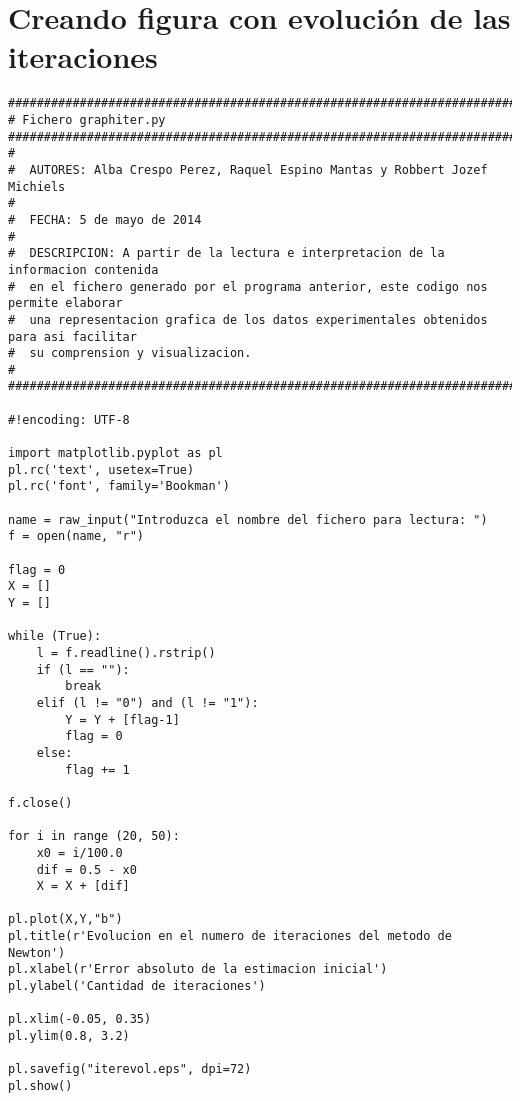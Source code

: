 \section{Creando figura con evoluci\'on de las iteraciones}
\label{Apendice2:label2}

\begin{center}
\begin{footnotesize}

\begin{verbatim}
#######################################################################################
# Fichero graphiter.py
#######################################################################################
#
#  AUTORES: Alba Crespo Perez, Raquel Espino Mantas y Robbert Jozef Michiels
#   
#  FECHA: 5 de mayo de 2014
#
#  DESCRIPCION: A partir de la lectura e interpretacion de la informacion contenida
#  en el fichero generado por el programa anterior, este codigo nos permite elaborar
#  una representacion grafica de los datos experimentales obtenidos para asi facilitar 
#  su comprension y visualizacion. 
#
#######################################################################################

#!encoding: UTF-8

import matplotlib.pyplot as pl
pl.rc('text', usetex=True)
pl.rc('font', family='Bookman')

name = raw_input("Introduzca el nombre del fichero para lectura: ")
f = open(name, "r")

flag = 0
X = []
Y = []

while (True):
    l = f.readline().rstrip()
    if (l == ""):
        break
    elif (l != "0") and (l != "1"):
        Y = Y + [flag-1]
        flag = 0
    else:
        flag += 1

f.close()

for i in range (20, 50):
    x0 = i/100.0
    dif = 0.5 - x0
    X = X + [dif]

pl.plot(X,Y,"b")
pl.title(r'Evolucion en el numero de iteraciones del metodo de Newton') 
pl.xlabel(r'Error absoluto de la estimacion inicial')
pl.ylabel('Cantidad de iteraciones')

pl.xlim(-0.05, 0.35)
pl.ylim(0.8, 3.2)

pl.savefig("iterevol.eps", dpi=72)
pl.show()

\end{verbatim}


\end{footnotesize}
\end{center}

